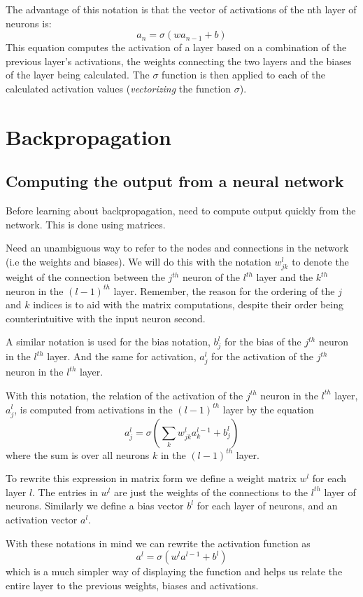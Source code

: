 \documentclass[a4paper,12pt]{article}
\begin{document}
The advantage of this notation is that the vector of activations of the nth layer of neurons is: $$a_n = \sigma (wa_{n-1}+b)$$ This equation computes the activation of a layer based on a combination of the previous layer's activations, the weights connecting the two layers and the biases of the layer being calculated. The $\sigma$ function is then applied to each of the calculated activation values (\textit{vectorizing} the function $\sigma$).

\section{Backpropagation}

\subsection{Computing the output from a neural network}
Before learning about backpropagation, need to compute output quickly from the network. This is done using matrices. 

Need an unambiguous way to refer to the nodes and connections in the network (i.e the weights and biases). We will do this with the notation $w^l_{jk}$ to denote the weight of the connection between the $j^{th}$ neuron of the $l^{th}$ layer and the $k^{th}$ neuron in the $(l-1)^{th}$ layer. Remember, the reason for the ordering of the $j$ and $k$ indices is to aid with the matrix computations, despite their order being counterintuitive with the input neuron second.

A similar notation is used for the bias notation, $b^l_j$ for the bias of the $j^{th}$ neuron in the $l^{th}$ layer. And the same for activation, $a^l_j$ for the activation of the $j^{th}$ neuron in the $l^{th}$ layer.

With this notation, the relation of the activation of the $j^{th}$ neuron in the $l^{th}$ layer, $a^l_j$, is computed from activations in the $(l-1)^{th}$ layer by the equation $$a^l_j=\sigma(\sum_k w^l_{jk}a^{l-1}_k+b^l_j)$$ where the sum is over all neurons $k$ in the $(l-1)^{th}$ layer.

To rewrite this expression in matrix form we define a weight matrix $w^l$ for each layer $l$. The entries in $w^l$ are just the weights of the connections to the $l^{th}$ layer of neurons. Similarly we define a bias vector $b^l$ for each layer of neurons, and an activation vector $a^l$.

With these notations in mind we can rewrite the activation function as $$a^l=\sigma (w^la^{l-1}+b^l)$$ which is a much simpler way of displaying the function and helps us relate the entire layer to the previous weights, biases and activations.
\end{document}
